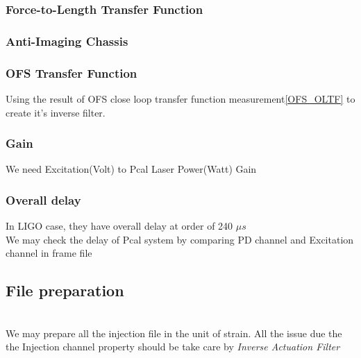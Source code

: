     \subsubsection{Force-to-Length Transfer Function}
    
    \subsubsection{Anti-Imaging Chassis}
    
    \subsubsection{OFS Transfer Function}
    Using the result of OFS close loop transfer function measurement\ref{OFS_OLTF} to create it's inverse filter. 
    \subsubsection{Gain}
    We need Excitation(Volt) to Pcal Laser Power(Watt) Gain
    
    \subsubsection{Overall delay}
In LIGO case, they have overall delay at order of 240 $\mu s$ \cite{ligo:inj}\\
We may check the delay of Pcal system by comparing PD channel and Excitation channel in frame file


\subsection{File preparation}
\\
We may prepare all the injection file in the unit of strain. All the issue due the the Injection channel property should be take care by \emph{Inverse Actuation Filter}
